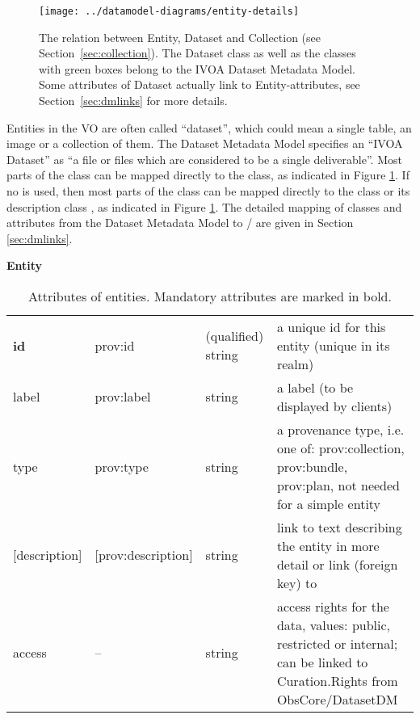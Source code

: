 \begin{figure}[h]
\centering
\texttt{[image: ../datamodel-diagrams/entity-details]}
\caption{The relation between Entity, Dataset and Collection (see Section~\ref{sec:collection}). 
The Dataset class as well as the classes with green boxes belong to
the IVOA Dataset Metadata Model. Some attributes of Dataset actually link to Entity-attributes, 
see Section~\ref{sec:dmlinks} for more details.}
\label{fig:entity-details}
\end{figure}

Entities in the VO are often called ``dataset'', which could mean a single 
table, an image or a collection of them. The Dataset Metadata Model 
\citep{std:DatasetDM} specifies an ``IVOA Dataset'' as ``a file or files which 
are considered to be a single deliverable''. 
Most parts of the  class can be mapped
directly to the  class, as indicated in Figure \ref{fig:entity-details}.
If no  is used, then most parts of the  class can be mapped
directly to the  class or its description class ,
as indicated in Figure \ref{fig:entity-details}.
The detailed mapping of classes and attributes from the Dataset Metadata Model 
to / are given in Section \ref{sec:dmlinks}. 


\begin{table}[h]

\small
{}\textwidth

\textbf{\normalsize Entity}\vspace{0.25em}\\
\begin{tabulary}{1.0\textwidth}{@{}lp{3.5cm}p{2cm}L@{}}
\toprule
{} &  &  & \\
\midrule
\textbf{id} & prov:id & (qualified) string & a unique id for this entity (unique in its realm)\\
label       & prov:label & string & a label (to be displayed by clients)\\
type        & prov:type  & string & a provenance type, i.e. one of: prov:collection, prov:bundle, prov:plan, not needed for a simple entity\\
{[description]}  & [prov:description] & string & link to text describing the entity in more detail or link (foreign key) to \\
access            & -- & string & access rights for the data, values: public, restricted or internal; can be linked to Curation.Rights from ObsCore/DatasetDM\\
\bottomrule
\end{tabulary}
\caption{Attributes of entities. Mandatory attributes are marked in bold.
}\label{tab:entity-attributes}
\end{table}

